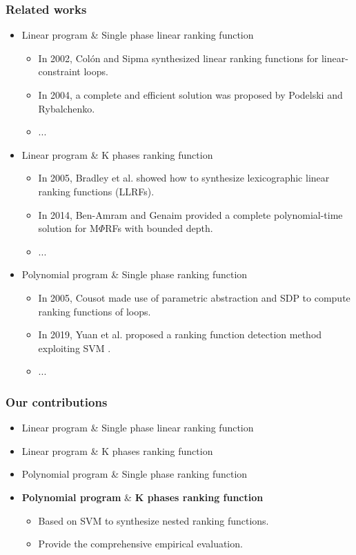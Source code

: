 \begin{frame}
\frametitle{Related works}
\begin{itemize}
\item \red Linear program \& Single phase linear ranking function
\begin{itemize}
\item In 2002, Col\'{o}n and Sipma synthesized linear ranking functions for linear-constraint loops. 
\item In 2004, a complete and efficient solution was proposed by Podelski and Rybalchenko.
\item ...
\end{itemize}
\item \red Linear program \& K phases ranking function 
\begin{itemize}
\item In 2005, Bradley et al. showed how to synthesize lexicographic linear ranking functions (LLRFs).
\item In 2014, Ben-Amram and Genaim provided a complete polynomial-time solution for M$\Phi$RFs with bounded depth.
\item ...
\end{itemize}
\item \red Polynomial program \& Single phase ranking function
\begin{itemize}
\item In 2005, Cousot made use of parametric abstraction and SDP to compute ranking functions of loops. 
\item In 2019, Yuan et al. proposed a ranking function detection method exploiting SVM .
\item ...
\end{itemize}
\end{itemize}
\end{frame}

\begin{frame}
\frametitle{Our contributions}
\begin{itemize}
\item Linear program \& Single phase linear ranking function
\item Linear program \& K phases ranking function 
\item Polynomial program \& Single phase ranking function
\item \textbf{\red Polynomial program} \& \textbf{\red K phases ranking function} 
\begin{itemize}
\item Based on SVM to synthesize nested ranking functions.
\item Provide the comprehensive empirical evaluation.
\end{itemize}
\end{itemize}
\end{frame}



